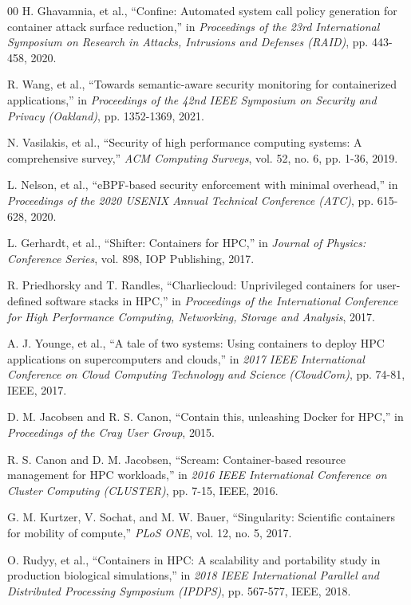 \documentclass[conference]{IEEEtran}
\begin{document}
\begin{thebibliography}{00}
 H. Ghavamnia, et al., ``Confine: Automated system call policy generation for container attack surface reduction,'' in \textit{Proceedings of the 23rd International Symposium on Research in Attacks, Intrusions and Defenses (RAID)}, pp. 443-458, 2020.

 R. Wang, et al., ``Towards semantic-aware security monitoring for containerized applications,'' in \textit{Proceedings of the 42nd IEEE Symposium on Security and Privacy (Oakland)}, pp. 1352-1369, 2021.

 N. Vasilakis, et al., ``Security of high performance computing systems: A comprehensive survey,'' \textit{ACM Computing Surveys}, vol. 52, no. 6, pp. 1-36, 2019.

 L. Nelson, et al., ``eBPF-based security enforcement with minimal overhead,'' in \textit{Proceedings of the 2020 USENIX Annual Technical Conference (ATC)}, pp. 615-628, 2020.

 L. Gerhardt, et al., ``Shifter: Containers for HPC,'' in \textit{Journal of Physics: Conference Series}, vol. 898, IOP Publishing, 2017.

 R. Priedhorsky and T. Randles, ``Charliecloud: Unprivileged containers for user-defined software stacks in HPC,'' in \textit{Proceedings of the International Conference for High Performance Computing, Networking, Storage and Analysis}, 2017.

 A. J. Younge, et al., ``A tale of two systems: Using containers to deploy HPC applications on supercomputers and clouds,'' in \textit{2017 IEEE International Conference on Cloud Computing Technology and Science (CloudCom)}, pp. 74-81, IEEE, 2017.

 D. M. Jacobsen and R. S. Canon, ``Contain this, unleashing Docker for HPC,'' in \textit{Proceedings of the Cray User Group}, 2015.

 R. S. Canon and D. M. Jacobsen, ``Scream: Container-based resource management for HPC workloads,'' in \textit{2016 IEEE International Conference on Cluster Computing (CLUSTER)}, pp. 7-15, IEEE, 2016.

 G. M. Kurtzer, V. Sochat, and M. W. Bauer, ``Singularity: Scientific containers for mobility of compute,'' \textit{PLoS ONE}, vol. 12, no. 5, 2017.

 O. Rudyy, et al., ``Containers in HPC: A scalability and portability study in production biological simulations,'' in \textit{2018 IEEE International Parallel and Distributed Processing Symposium (IPDPS)}, pp. 567-577, IEEE, 2018.


\end{thebibliography}
\end{document}
